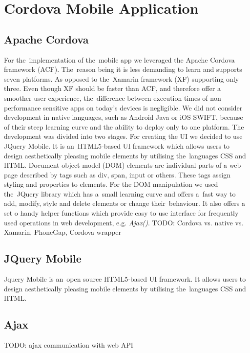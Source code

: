 \section{Cordova Mobile Application}
\subsection{Apache Cordova}
For the~implementation of the~mobile app we leveraged the Apache Cordova framework (ACF). The~reason being it is less demanding to learn and supports seven platforms. As opposed to the~Xamarin framework (XF) supporting only three. Even though XF should be faster than ACF, and therefore offer a smoother user experience, the~difference between execution times of non performance sensitive apps on today's devices is negligible. We did not consider development in native languages, such as Android Java or iOS SWIFT, because of their steep learning curve and the ability to deploy only to one platform. The development was divided into two stages. For creating the UI  we decided to use JQuery Mobile. It is an~HTML5-based UI framework which allows users to design aesthetically pleasing mobile elements by utilising the~languages CSS and HTML. Document object model (DOM) elements are individual parts of a web page described by tags such as div, span, input or others. These tags assign styling and properties to elements. For the DOM manipulation we used the~JQuery library which has a~small learning curve and offers a~fast way to add, modify, style and delete elements or change their~behaviour. It also offers a set o handy helper functions which provide easy to use interface for frequently used operations in web development, e.g. \textit{Ajax()}.
TODO: Cordova vs. native vs. Xamarin, PhoneGap, Cordova wrapper
\subsection{JQuery Mobile}
Jquery Mobile is an~open source HTML5-based UI framework. It allows users to design aesthetically pleasing mobile elements by utilising the~languages CSS and HTML. 
\subsection{Ajax}
TODO: ajax communication with web API


